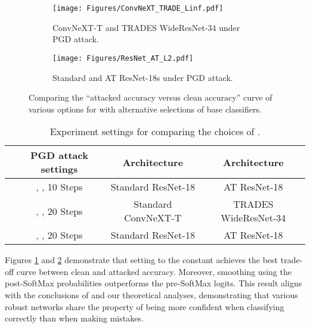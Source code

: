 \documentclass[11pt, letterpaper]{article}
\theoremstyle{plain}
\theoremstyle{definition}
\begin{document}
\begin{figure}[t]
	\centering
	\begin{subfigure}[t]{.48\textwidth}
		\captionsetup{justification=centering}
		\centering
		\texttt{[image: Figures/ConvNeXT\_TRADE\_Linf.pdf]}
		\vspace*{-2mm}
		\caption{\footnotesize ConvNeXT-T and TRADES WideResNet-34 under  PGD attack.}
		\label{fig:compare_R_2a}
	\end{subfigure}
	\hspace{4mm}
	\begin{subfigure}[t]{.48\textwidth}
		\captionsetup{justification=centering}
		\centering
		\texttt{[image: Figures/ResNet\_AT\_L2.pdf]}
		\vspace*{-2mm}
		\caption{\footnotesize Standard and AT ResNet-18s under  PGD attack.}
		\label{fig:compare_R_2b}
	\end{subfigure}
	
	\vspace{-4.5mm}
	\caption{Comparing the ``attacked accuracy versus clean accuracy'' curve of various options for  with alternative selections of base classifiers.}
	\label{fig:compare_R_2}
\end{figure}

\begin{table}[t]
	\centering
	\caption{Experiment settings for comparing the choices of .}
	\vspace{-1.5mm}
	\label{tab:compare_R_settings}
	\begin{small}
	\begin{tabular}{l|c|c|c}
		\toprule
		& PGD attack settings	&  Architecture	&  Architecture \\
		\midrule
		\Cref{fig:compare_R}    & , , 10 Steps	& Standard ResNet-18	&  AT ResNet-18				\\
		\Cref{fig:compare_R_2a} & , , 20 Steps	& Standard ConvNeXT-T &  TRADES WideResNet-34		\\
		\Cref{fig:compare_R_2b} & , , 20 Steps		  		  		& Standard ResNet-18	&  AT ResNet-18					\\
		\bottomrule
	\end{tabular}
	\end{small}
	\vspace{1.5mm}
\end{table}

Figures \ref{fig:compare_R_2a} and \ref{fig:compare_R_2b} demonstrate that setting  to the constant  achieves the best trade-off curve between clean and attacked accuracy. Moreover, smoothing using the post-SoftMax probabilities outperforms the pre-SoftMax logits. This result aligns with the conclusions of  and our theoretical analyses, demonstrating that various robust networks share the property of being more confident when classifying correctly than when making mistakes.
\end{document}
